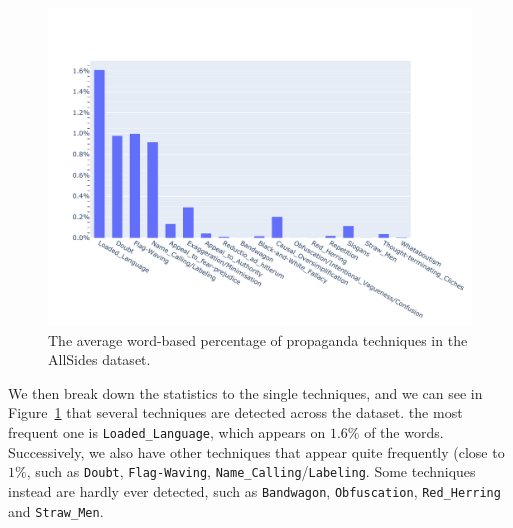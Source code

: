 
\begin{figure}[!htbp]
    \centering
    \includegraphics[width=\linewidth]{figures/prop_tech_detail_baly.pdf}
    \caption{The average word-based percentage of propaganda techniques in the AllSides dataset.}
    \label{fig:prop_tech_detail_baly}
\end{figure}

We then break down the statistics to the single techniques, and we can see in Figure~\ref{fig:prop_tech_detail_baly} that several techniques are detected across the dataset.
the most frequent one is \texttt{Loaded\_Language}, which appears on $1.6\%$ of the words.
Successively, we also have other techniques that appear quite frequently (close to $1\%$, such as \texttt{Doubt}, \texttt{Flag-Waving}, \texttt{Name\_Calling}/\texttt{Labeling}. Some techniques instead are hardly ever detected, such as \texttt{Bandwagon}, \texttt{Obfuscation}, \texttt{Red\_Herring} and \texttt{Straw\_Men}.





